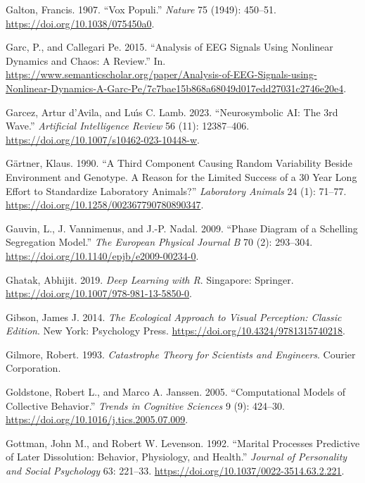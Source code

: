 \documentclass[
  a4paper,
  DIV=11,
  numbers=noendperiod,
  oneside]{scrreprt}
\newlength{\cslhangindent}
\newenvironment{CSLReferences}[2] %
 {\begin{list}{}{%
  \setlength{\itemindent}{0pt}
  \setlength{\leftmargin}{0pt}
  \setlength{\parsep}{0pt}
  \ifodd #1
   \setlength{\leftmargin}{\cslhangindent}
   \setlength{\itemindent}{-1\cslhangindent}
  \fi
  \setlength{\itemsep}{#2\baselineskip}}}
 {\end{list}}
\begin{document}
\begin{CSLReferences}{1}{0}
Galton, Francis. 1907. {``Vox Populi.''} \emph{Nature} 75 (1949):
450--51. \url{https://doi.org/10.1038/075450a0}.

Garc, P., and Callegari Pe. 2015. {``Analysis of EEG Signals Using
Nonlinear Dynamics and Chaos: A Review.''} In.
\url{https://www.semanticscholar.org/paper/Analysis-of-EEG-Signals-using-Nonlinear-Dynamics-A-Garc-Pe/7c7bae15b868a68049d017edd27031c2746e20e4}.

Garcez, Artur d'Avila, and Luı́s C. Lamb. 2023. {``Neurosymbolic AI: The
3rd Wave.''} \emph{Artificial Intelligence Review} 56 (11): 12387--406.
\url{https://doi.org/10.1007/s10462-023-10448-w}.

Gärtner, Klaus. 1990. {``A Third Component Causing Random Variability
Beside Environment and Genotype. {A} Reason for the Limited Success of a
30 Year Long Effort to Standardize Laboratory Animals?''}
\emph{Laboratory Animals} 24 (1): 71--77.
\url{https://doi.org/10.1258/002367790780890347}.

Gauvin, L., J. Vannimenus, and J.-P. Nadal. 2009. {``Phase Diagram of a
{Schelling} Segregation Model.''} \emph{The European Physical Journal B}
70 (2): 293--304. \url{https://doi.org/10.1140/epjb/e2009-00234-0}.

Ghatak, Abhijit. 2019. \emph{Deep {Learning} with {R}}. {Singapore}:
{Springer}. \url{https://doi.org/10.1007/978-981-13-5850-0}.

Gibson, James J. 2014. \emph{The {Ecological Approach} to {Visual
Perception}: {Classic Edition}}. {New York}: {Psychology Press}.
\url{https://doi.org/10.4324/9781315740218}.

Gilmore, Robert. 1993. \emph{Catastrophe {Theory} for {Scientists} and
{Engineers}}. {Courier Corporation}.

Goldstone, Robert L., and Marco A. Janssen. 2005. {``Computational
Models of Collective Behavior.''} \emph{Trends in Cognitive Sciences} 9
(9): 424--30. \url{https://doi.org/10.1016/j.tics.2005.07.009}.

Gottman, John M., and Robert W. Levenson. 1992. {``Marital Processes
Predictive of Later Dissolution: {Behavior}, Physiology, and Health.''}
\emph{Journal of Personality and Social Psychology} 63: 221--33.
\url{https://doi.org/10.1037/0022-3514.63.2.221}.


\end{CSLReferences}
\end{document}

